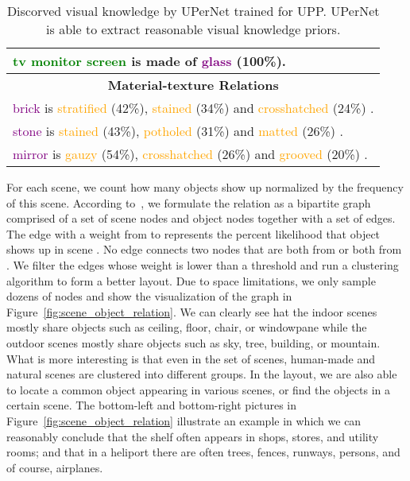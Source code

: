 \documentclass[runningheads]{llncs}
\begin{document}
\begin{table*}[!ht]
\begin{center}
{\begin{tabular}{l}
\textcolor{green}{tv monitor screen} is made of \textcolor{purple}{glass} (100\%).\\

\hline

\multicolumn{1}{c}{\textbf{Material-texture Relations}} \\
\textcolor{purple}{brick} is \textcolor{orange}{stratified} (42\%), \textcolor{orange}{stained} (34\%) and \textcolor{orange}{crosshatched} (24\%) . \\

\textcolor{purple}{stone} is \textcolor{orange}{stained} (43\%), \textcolor{orange}{potholed} (31\%) and \textcolor{orange}{matted} (26\%) . \\

\textcolor{purple}{mirror} is \textcolor{orange}{gauzy} (54\%), \textcolor{orange}{crosshatched} (26\%) and \textcolor{orange}{grooved} (20\%) . \\
\bottomrule[0.8pt]
\end{tabular}}
\end{center}
\caption{Discorved visual knowledge by UPerNet trained for UPP. UPerNet is able to extract reasonable visual knowledge priors.}
\label{tab:auto_generation}
\end{table*}



 For each scene, we count how many objects show up normalized by the frequency of this scene. According to~\cite{brandes2013network}, we formulate the relation as a bipartite graph  comprised of a set  of scene nodes and object nodes together with a set  of edges. The edge with a weight from  to  represents the percent likelihood that object  shows up in scene . No edge connects two nodes that are both from  or both from . We filter the edges whose weight is lower than a threshold and run a clustering algorithm to form a better layout. Due to space limitations, we only sample dozens of nodes and show the visualization of the graph in Figure~\ref{fig:scene_object_relation}. We can clearly see hat the indoor scenes mostly share objects such as ceiling, floor, chair, or windowpane while the outdoor scenes mostly share objects such as sky, tree, building, or mountain. What is more interesting is that even in the set of scenes, human-made and natural scenes are clustered into different groups. In the layout, we are also able to locate a common object appearing in various scenes, or find the objects in a certain scene. The bottom-left and bottom-right pictures in Figure~\ref{fig:scene_object_relation} illustrate an example in which we can reasonably conclude that the shelf often appears in shops, stores, and utility rooms; and that in a heliport there are often trees, fences, runways, persons, and of course, airplanes.
\end{document}
